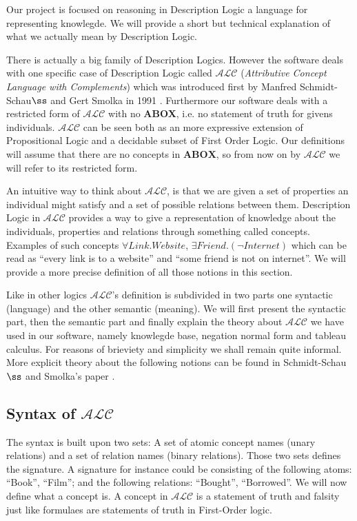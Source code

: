 Our project is focused on reasoning in Description Logic a language
for representing knowlegde. We will provide a short but technical
explanation of what we actually mean by Description Logic. 

There is actually a big family of Description Logics. However the
software deals with one specific case of Description Logic called
$\mathcal{ALC}$ (\textit{Attributive Concept Language with
Complements}) which was introduced first by Manfred Schmidt-Schau$\ss$ 
and Gert Smolka in 1991 \cite{msgs}. Furthermore our software deals
with a restricted form of $\mathcal{ALC}$ with no \textbf{ABOX},
i.e. no statement of truth for givens individuals. $\mathcal{ALC}$ can
be seen both as an more expressive extension of Propositional Logic
and a decidable subset of First Order Logic. Our definitions will
assume that there are no concepts in $\textbf{ABOX}$, so from now on by
$\mathcal{ALC}$ we will refer to its restricted form.

An intuitive way to think about $\mathcal{ALC}$, is that we are given
a set of properties an individual might satisfy and a set of possible
relations between them. Description Logic in $\mathcal{ALC}$ provides
a way to give a representation of knowledge about the individuals,
properties and relations through something called concepts. Examples
of such concepts $\forall Link . Website$, $\exists Friend . (\neg
Internet)$ which can be read as ``every link is to a website'' and
``some friend is not on internet''. We will provide a more precise
definition of all those notions in this section.

Like in other logics $\mathcal{ALC}$'s definition is subdivided in two
parts one syntactic (language) and the other semantic (meaning). We
will first present the syntactic part, then the semantic part and
finally explain the theory about $\mathcal{ALC}$ we have used in our
software, namely knowlegde base, negation normal form and tableau
calculus. For reasons of brieviety and simplicity we shall remain
quite informal. More explicit theory about the following notions can be
found in Schmidt-Schau$\ss$ and Smolka's paper \cite{msgs}.

\subsection{Syntax of $\mathcal{ALC}$}

The syntax is built upon two sets: A set of atomic concept names
(unary relations) and a set of relation names (binary
relations). Those two sets defines the signature. A signature for
instance could be consisting of the following atoms: ``Book'',
``Film''; and the following relations: ``Bought'', ``Borrowed''. We
will now define what a concept is. A concept in $\mathcal{ALC}$ is a
statement of truth and falsity just like formulaes are statements of
truth in First-Order logic.

